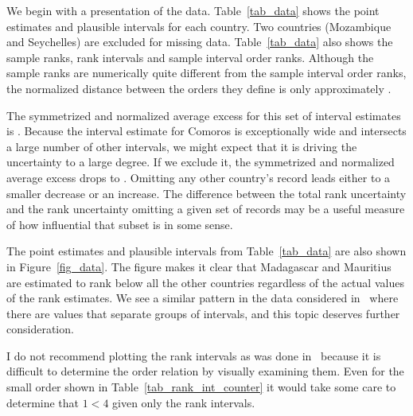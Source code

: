 \documentclass[12pt]{article}
\numberwithin{theorem}{section}
\begin{document}
We begin with a presentation of the data.  Table~\ref{tab_data} shows the point estimates and plausible intervals for each country.  Two countries (Mozambique and Seychelles) are excluded for missing data.  Table~\ref{tab_data} also shows the sample ranks, rank intervals and sample interval order ranks.  Although the sample ranks are numerically quite different from the sample interval order ranks, the normalized distance between the orders they define is only approximately \dataRankDistance.

The symmetrized and normalized average excess for this set of interval estimates is \dataUncertainty.  Because the interval estimate for Comoros is exceptionally wide and intersects a large number of other intervals, we might expect that it is driving the uncertainty to a large degree.  If we exclude it, the symmetrized and normalized average excess drops to \dataSubsetUncertainty.  Omitting any other country's record leads either to a smaller decrease or an increase.  The difference between the total rank uncertainty and the rank uncertainty omitting a given set of records may be a useful measure of how influential that subset is in some sense.

The point estimates and plausible intervals from Table~\ref{tab_data} are also shown in Figure~\ref{fig_data}.  The figure makes it clear that Madagascar and Mauritius are estimated to rank below all the other countries regardless of the actual values of the rank estimates.  We see a similar pattern in the data considered in~\cite{klein2020jointCR} where there are values that separate groups of intervals, and this topic deserves further consideration.

I do not recommend plotting the rank intervals as was done in~\cite{klein2020jointCR} because it is difficult to determine the order relation by visually examining them.  Even for the small order shown in Table~\ref{tab_rank_int_counter} it would take some care to determine that $1 < 4$ given only the rank intervals.



\end{document}
